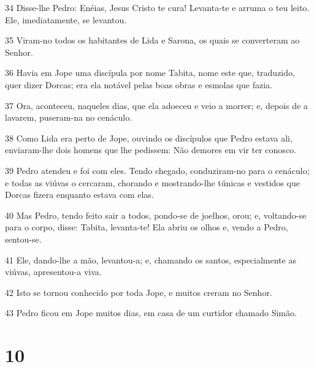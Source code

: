 \par 34 Disse-lhe Pedro: Enéias, Jesus Cristo te cura! Levanta-te e arruma o teu leito. Ele, imediatamente, se levantou.
\par 35 Viram-no todos os habitantes de Lida e Sarona, os quais se converteram ao Senhor.
\par 36 Havia em Jope uma discípula por nome Tabita, nome este que, traduzido, quer dizer Dorcas; era ela notável pelas boas obras e esmolas que fazia.
\par 37 Ora, aconteceu, naqueles dias, que ela adoeceu e veio a morrer; e, depois de a lavarem, puseram-na no cenáculo.
\par 38 Como Lida era perto de Jope, ouvindo os discípulos que Pedro estava ali, enviaram-lhe dois homens que lhe pedissem: Não demores em vir ter conosco.
\par 39 Pedro atendeu e foi com eles. Tendo chegado, conduziram-no para o cenáculo; e todas as viúvas o cercaram, chorando e mostrando-lhe túnicas e vestidos que Dorcas fizera enquanto estava com elas.
\par 40 Mas Pedro, tendo feito sair a todos, pondo-se de joelhos, orou; e, voltando-se para o corpo, disse: Tabita, levanta-te! Ela abriu os olhos e, vendo a Pedro, sentou-se.
\par 41 Ele, dando-lhe a mão, levantou-a; e, chamando os santos, especialmente as viúvas, apresentou-a viva.
\par 42 Isto se tornou conhecido por toda Jope, e muitos creram no Senhor.
\par 43 Pedro ficou em Jope muitos dias, em casa de um curtidor chamado Simão.

\chapter{10}

